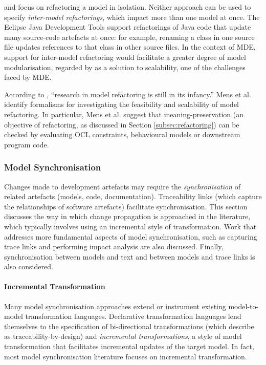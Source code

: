  
\cite{kolovos07ewl} and \cite{arendt09refactoring} focus on refactoring a model in isolation. Neither approach can be used to specify \emph{inter-model refactorings}, which impact more than one model at once. The Eclipse Java Development Tools support refactorings of Java code that update many source-code artefacts at once: for example, renaming a class in one source file updates references to that class in other source files. In the context of MDE, support for inter-model refactoring would facilitate a greater degree of model modularisation, regarded by \cite{kolovos08scalability} as a solution to scalability, one of the challenges faced by MDE.

According to \cite{mens07modelrefactoring}, ``research in model refactoring is still in its infancy.'' Mens et al. identify formalisms for investigating the feasibility and scalability of model refactoring. In particular, Mens et al. suggest that meaning-preservation (an objective of refactoring, as discussed in Section \ref{subsec:refactoring}) can be checked by evaluating OCL constraints, behavioural models or downstream program code.


\subsubsection{Model Synchronisation}
\label{subsubsec:model_synch}
Changes made to development artefacts may require the \emph{synchronisation} of related artefacts (models, code, documentation). Traceability links (which capture the relationships of software artefacts) facilitate synchronisation. This section discusses the way in which change propagation is approached in the literature, which typically involves using an incremental style of transformation. Work that addresses more fundamental aspects of model synchronisation, such as capturing trace links and performing impact analysis are also discussed. Finally, synchronisation between models and text and between models and trace links is also considered.

\paragraph{Incremental Transformation}
Many model synchronisation approaches extend or instrument existing model-to-model transformation languages. Declarative transformation languages lend themselves to the specification of bi-directional transformations (which \cite{fritzsche08tracing} describe as traceability-by-design) and \emph{incremental transformations}, a style of model transformation that facilitates incremental updates of the target model. In fact, most model synchronisation literature focuses on incremental transformation. 

